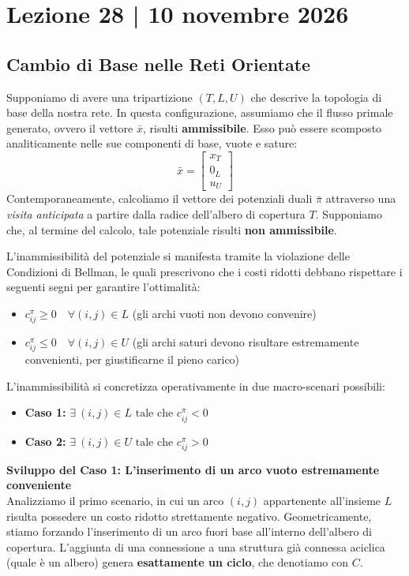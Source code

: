 \documentclass[12pt, a4paper]{article}
\begin{document}
	\section*{Lezione 28 | 10 novembre 2026}
	\subsection*{Cambio di Base nelle Reti Orientate}
	
	Supponiamo di avere una tripartizione $(T, L, U)$ che descrive la topologia di base della nostra rete. In questa configurazione, assumiamo che il flusso primale generato, ovvero il vettore $\bar{x}$, risulti \textbf{ammissibile}. Esso può essere scomposto analiticamente nelle sue componenti di base, vuote e sature:
	\[
	\bar{x} = 
	\begin{bmatrix}
		x_T \\ 0_L \\ u_U
	\end{bmatrix}
	\]
	Contemporaneamente, calcoliamo il vettore dei potenziali duali $\bar{\pi}$ attraverso una \textit{visita anticipata} a partire dalla radice dell'albero di copertura $T$. Supponiamo che, al termine del calcolo, tale potenziale risulti \textbf{non ammissibile}. 
	
	L'inammissibilità del potenziale si manifesta tramite la violazione delle Condizioni di Bellman, le quali prescrivono che i costi ridotti debbano rispettare i seguenti segni per garantire l'ottimalità:
	\begin{itemize}
		\item $c^\pi_{ij} \ge 0 \quad \forall (i, j) \in L$ \quad (gli archi vuoti non devono convenire)
		\item $c^\pi_{ij} \le 0 \quad \forall (i, j) \in U$ \quad (gli archi saturi devono risultare estremamente convenienti, per giustificarne il pieno carico)
	\end{itemize}
	
	L'inammissibilità si concretizza operativamente in due macro-scenari possibili:
	\begin{itemize}
		\item \textbf{Caso 1:} $\exists \ (i, j) \in L \text{ tale che } c^\pi_{ij} < 0$
		\item \textbf{Caso 2:} $\exists \ (i, j) \in U \text{ tale che } c^\pi_{ij} > 0$
	\end{itemize}
	
	\vspace{0.4cm}
	\textbf{Sviluppo del Caso 1: L'inserimento di un arco vuoto estremamente conveniente}\\
	Analizziamo il primo scenario, in cui un arco $(i, j)$ appartenente all'insieme $L$ risulta possedere un costo ridotto strettamente negativo. Geometricamente, stiamo forzando l'inserimento di un arco fuori base all'interno dell'albero di copertura. L'aggiunta di una connessione a una struttura già connessa aciclica (quale è un albero) genera \textbf{esattamente un ciclo}, che denotiamo con $C$.
	
\end{document}

